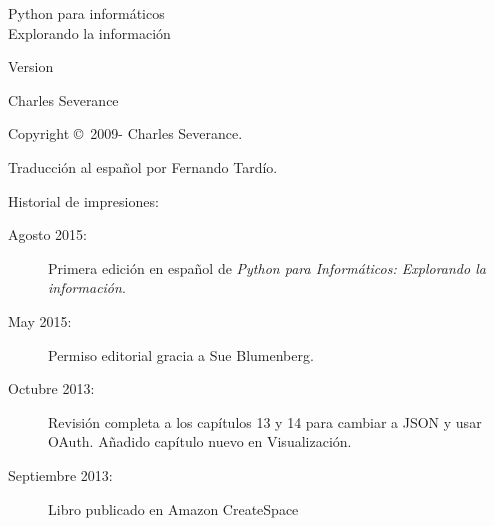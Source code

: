 



\newtheorem{ex}{Ejercicio}[chapter]

\begin{latexonly}

\renewcommand{\blankpage}{\thispagestyle{empty} \quad \newpage}

\thispagestyle{empty}

\begin{flushright}
\vspace*{2.0in}

\begin{spacing}{3}
{\huge Python para informáticos}\\
{\Large Explorando la información}
\end{spacing}

\vspace{0.25in}

Version \theversion

\vspace{0.5in}


{\Large
Charles Severance\\
}

\vfill

\end{flushright}

\pagebreak
\thispagestyle{empty}

{\small
Copyright \copyright ~2009- Charles Severance.

Traducción al español por Fernando Tardío.


Historial de impresiones:

\begin{description}
	
\item[Agosto 2015:] Primera edición en español de \emph{Python para Informáticos:
Explorando la información}.

\item[May 2015:] Permiso editorial gracia a Sue Blumenberg.

\item[Octubre 2013:] Revisión completa a los capítulos 13 y 14
para cambiar a JSON y usar OAuth.
Añadido capítulo nuevo en Visualización.

\item[Septiembre 2013:] Libro publicado en Amazon CreateSpace


\end{description}}
\end{latexonly}
